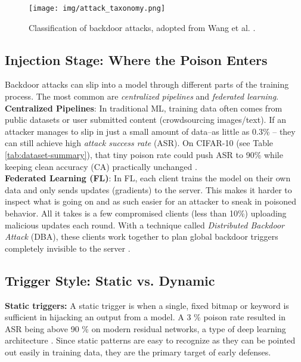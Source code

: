 \documentclass[sigconf,authorversion,nonacm,balance=false]{acmart}
\begin{document}
\begin{figure}[t]
  \centering
  \texttt{[image: img/attack\_taxonomy.png]}
  \caption{Classification of backdoor attacks, adopted from Wang et al. \cite{attack_defense_wang_2023}.}
  \label{fig:attack-taxonomy}
\end{figure}

\subsection{Injection Stage: Where the Poison Enters}
\label{sec:injection}

Backdoor attacks can slip into a model through different parts of the training process. The most common are \textit{centralized pipelines} and \textit{federated learning}. \\
\textbf{Centralized Pipelines}: In traditional ML, training data often comes from public datasets or user submitted content (crowdsourcing images/text). If an attacker manages to slip in just a small amount of data–as little as 0.3\% – they can still achieve high \textit{attack success rate} (ASR). On CIFAR-10 (see Table \ref{tab:dataset-summary}), that tiny poison rate could push ASR to 90\% while keeping clean accuracy (CA) practically unchanged \cite{attack_defense_wang_2023}. \\
\textbf{Federated Learning (FL)}: In FL, each client trains the model on their own data and only sends updates (gradients) to the server. This makes it harder to inspect what is going on and as such easier for an attacker to sneak in poisoned behavior. All it takes is a few compromised clients (less than 10\%) uploading malicious updates each round. With a technique called \textit{Distributed Backdoor Attack} (DBA), these clients work together to plan global backdoor triggers completely invisible to the server \cite{casestudy_walter_2024}. 

\subsection{Trigger Style: Static vs. Dynamic}
\label{sec:trigger}

\textbf{Static triggers:} A static trigger is when a single, fixed bitmap or keyword is sufficient in hijacking an output from a model. A 3 \% poison rate resulted in ASR being above 90 \% on modern residual networks, a type of deep learning architecture \cite{attack_defense_wang_2023}. Since static patterns are easy to recognize as they can be pointed out easily in training data, they are the primary target of early defenses.
\end{document}
